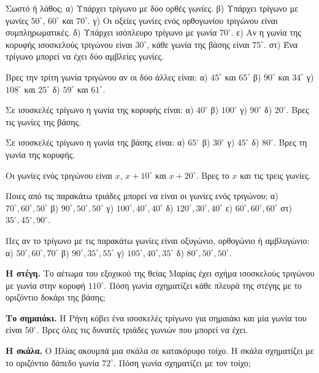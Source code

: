 

\ex Σωστό ή λάθος; α) Υπάρχει τρίγωνο με δύο ορθές γωνίες. β) Υπάρχει τρίγωνο με γωνίες $50^\circ$, $60^\circ$ και $70^\circ$. γ) Οι οξείες γωνίες ενός ορθογωνίου τριγώνου είναι συμπληρωματικές. δ) Υπάρχει ισόπλευρο τρίγωνο με γωνία $70^\circ$. ε) Αν η γωνία της κορυφής ισοσκελούς τριγώνου είναι $30^\circ$, κάθε γωνία της βάσης είναι $75^\circ$. στ) Ένα τρίγωνο μπορεί να έχει δύο αμβλείες γωνίες.

\ex Βρες την τρίτη γωνία τριγώνου αν οι δύο άλλες είναι: α) $45^\circ$ και $65^\circ$ β) $90^\circ$ και $34^\circ$ γ) $108^\circ$ και $25^\circ$ δ) $59^\circ$ και $61^\circ$.

\ex Σε ισοσκελές τρίγωνο η γωνία της κορυφής είναι: α) $40^\circ$ β) $100^\circ$ γ) $90^\circ$ δ) $20^\circ$. Βρες τις γωνίες της βάσης.

\ex Σε ισοσκελές τρίγωνο η γωνία της βάσης είναι: α) $65^\circ$ β) $30^\circ$ γ) $45^\circ$ δ) $80^\circ$. Βρες τη γωνία της κορυφής.

\ex Οι γωνίες ενός τριγώνου είναι $x$, $x+10^\circ$ και $x+20^\circ$. Βρες το $x$ και τις τρεις γωνίες.

\ex Ποιες από τις παρακάτω τριάδες μπορεί να είναι οι γωνίες ενός τριγώνου; α) $70^\circ,60^\circ,50^\circ$ β) $90^\circ,50^\circ,50^\circ$ γ) $100^\circ,40^\circ,40^\circ$ δ) $120^\circ,30^\circ,40^\circ$ ε) $60^\circ,60^\circ,60^\circ$ στ) $35^\circ,45^\circ,90^\circ$.

\ex Πες αν το τρίγωνο με τις παρακάτω γωνίες είναι οξυγώνιο, ορθογώνιο ή αμβλυγώνιο: α) $50^\circ,60^\circ,70^\circ$ β) $90^\circ,35^\circ,55^\circ$ γ) $105^\circ,40^\circ,35^\circ$ δ) $80^\circ,50^\circ,50^\circ$.


\ex \textbf{Η στέγη.} Το αέτωμα του εξοχικού της θείας Μαρίας έχει σχήμα ισοσκελούς τριγώνου με γωνία στην κορυφή $110^\circ$. Πόση γωνία σχηματίζει κάθε πλευρά της στέγης με το οριζόντιο δοκάρι της βάσης;

\ex \textbf{Το σημαιάκι.} Η Ρήνη κόβει ένα ισοσκελές τρίγωνο για σημαιάκι και μία γωνία του είναι $50^\circ$. Βρες όλες τις δυνατές τριάδες γωνιών που μπορεί να έχει.

\ex \textbf{Η σκάλα.} Ο Ηλίας ακουμπά μια σκάλα σε κατακόρυφο τοίχο. Η σκάλα σχηματίζει με το οριζόντιο δάπεδο γωνία $72^\circ$. Πόση γωνία σχηματίζει με τον τοίχο;

